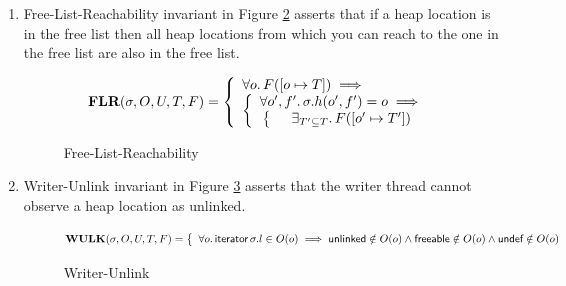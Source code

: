 \begin{enumerate}
\begin{figure}[!htb]
\[\left\{
\begin{array}{ll}
  \forall o \ldotp \textsf{unlinked} \in O(o) \implies \\
  \left\{
	\begin{array}{cl}
	  \forall o',f '\ldotp \sigma.h(o',f') = o \implies \\
          \left\{
			\begin{array}{cl}
				&\textsf{unlinked} \in O(o') \lor\\
				& \textsf{freeable} \in O(o')
			\end{array}
		\right.%
	\end{array}
	\right.%
\end{array}
\right.%
\]
\caption{Unlinked-Reachability}
\label{fig:unlinkreach}
\end{figure}
\item{Free-List-Reachability} invariant in Figure \ref{fig:freelistchain} asserts that if a heap location is in the free list then all heap locations from which you can reach to the one in the free list are also in the free list.
\begin{figure}[!htb]
\[
\textbf{FLR}(\sigma,O,U,T,F) =
\left\{
\begin{array}{ll}
  \forall o \ldotp F([o \mapsto T]) \implies \\
  \left\{
   		\begin{array}{cl}
		  \forall o',f' \ldotp \sigma.h(o',f') = o \implies \\
                \left\{
   \begin{array}{cl}
   	 		&\exists_{T'\subseteq T} \ldotp  F([o'\mapsto T']) 
   \end{array}
   \right.
                  \end{array}
 	\right.%
\end{array}
\right.%
\]
\caption{Free-List-Reachability}
\label{fig:freelistchain}
\end{figure}
\item{Writer-Unlink} invariant in Figure \ref{fig:mutunliked} asserts that the writer thread cannot observe a heap location as \textsf{unlinked}.
\begin{figure}[!htb]
\[
\textbf{WULK}(\sigma,O,U,T,F) =
\left\{
\begin{array}{ll}
\forall o \ldotp \textsf{iterator} \, \sigma.l \in O(o)  \implies \textsf{unlinked} \notin O(o)  \land \textsf{freeable} \notin O(o)  \land \textsf{undef} \notin O(o)
\end{array}
\right.%
\]
\caption{Writer-Unlink}
\label{fig:mutunliked}

\end{figure}
\end{enumerate}
